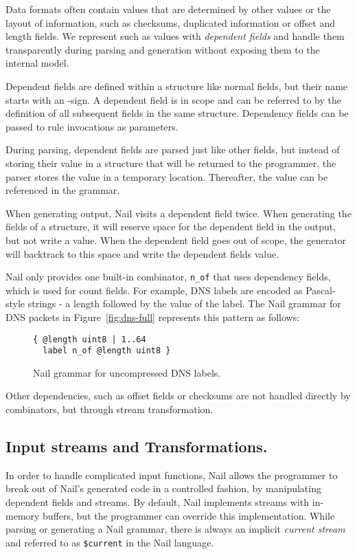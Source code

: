 Data formats often contain values that are determined by other values or the layout of information,
such as checksums, duplicated information  or offset and  length fields.
We represent such as values with \emph{dependent fields} and handle them transparently during
parsing and generation without exposing them to the internal model. 


Dependent fields are defined within a structure like normal fields, but their name starts with an \@-sign. 
A dependent field is in scope and can be referred to by the definition of all subsequent fields in
the same structure. Dependency fields can be passed to rule invocations as parameters.

During parsing, dependent fields are parsed just like other fields, but instead of storing their
value in a structure that will be returned to the programmer, the parser stores the value in a
temporary location. Thereafter, the value can be referenced in the grammar. 

When generating output, Nail visits a dependent field twice. When generating the fields of a
structure, it will reserve space for the dependent field in the output, but not write a value. When
the dependent field goes out of scope, the generator will backtrack to this space and write the
dependent fields value.

Nail only provides one built-in combinator, \texttt{n_of} that uses dependency fields, which is used
for count fields. For example, DNS labels are encoded as Pascal-style strings - a length followed by
the value of the label. The Nail grammar for DNS packets in Figure~\ref{fig:dns-full} represents
this pattern as follows:

\begin{figure}[tb]
\begin{verbatim}
{ @length uint8 | 1..64
  label n_of @length uint8 }
\end{verbatim}
\caption{Nail grammar for uncompressed DNS labels.}
\end{figure}

Other dependencies, such as offset fields or checksums are not handled directly by combinators, but
through stream transformation.

\subsection{Input streams and Transformations.}

In order to handle complicated input functions, Nail allows the programmer to
break out of Nail's generated code in a controlled fashion, by manipulating dependent fields and
streams. 
By default, Nail implements streams with in-memory buffers, but the programmer can override this implementation.
While parsing or generating a Nail grammar, there is always an implicit \emph{current stream} and
referred to as \texttt{\$current} in the Nail language.

